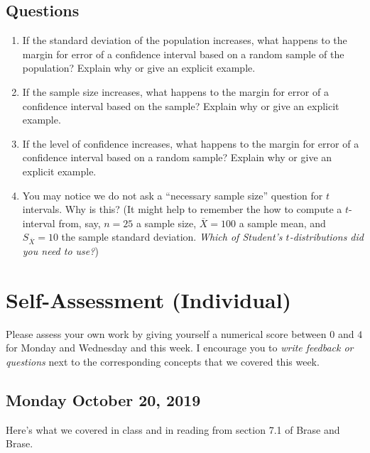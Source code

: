 \documentclass{ccg-topic}
\begin{document}
\subsection*{Questions}
\begin{enumerate}
    \item If the standard deviation of the population increases, what happens to the margin for error of a confidence interval based on a random sample of the population? Explain why or give an explicit example.
    
    \vfill
    
    \item If the sample size increases, what happens to the margin for error of a confidence interval based on the sample? Explain why or give an explicit example.
    
    \vfill

    \item If the level of confidence increases, what happens to the margin for error of a confidence interval based on a random sample? Explain why or give an explicit example.
    
    \vfill
    
    \item You may notice we do not ask a ``necessary sample size'' question for $t$ intervals. Why is this? (It might help to remember the how to compute a $t$-interval from, say, $n=25$ a sample size, $\overline{X} = 100$ a sample mean, and $S_{\overline{X}} = 10$ the sample standard deviation. \emph{Which of Student's $t$-distributions did you need to use?})

    \vfill    
\end{enumerate}

\newpage

\section*{Self-Assessment (Individual)}

Please assess your own work by giving yourself a numerical score between $0$ and $4$ for Monday and Wednesday and this week. I encourage you to \emph{write feedback or questions} next to the corresponding concepts that we covered this week.

\subsection*{Monday October 20, 2019}

Here's what we covered in class and in reading from section 7.1 of Brase and Brase. 
\end{document}
